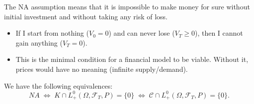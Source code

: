 \begin{tcolorbox}[title=Intuition: No Free Lunch, colback=red!5!white, colframe=red!50!black]
The NA assumption means that it is impossible to make money for sure without initial investment and without taking any risk of loss.
\begin{itemize}
    \item If I start from nothing ($V_0=0$) and can never lose ($V_T \ge 0$), then I cannot gain anything ($V_T=0$).
    \item This is the minimal condition for a financial model to be viable. Without it, prices would have no meaning (infinite supply/demand).
\end{itemize}
\end{tcolorbox}

\begin{lemma}
We have the following equivalences:
\begin{equation}
NA \;\Longleftrightarrow\; K \cap L_+^0(\Omega, \mathcal{F}_T, P) = \{0\}
\;\Longleftrightarrow\;
\mathcal{C} \cap L_+^0(\Omega, \mathcal{F}_T, P) = \{0\}.
\end{equation}
\end{lemma}


